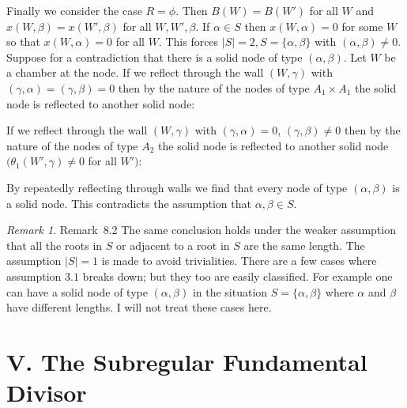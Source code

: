\documentclass{memo-l}
\theoremstyle{definition}
\theoremstyle{remark}
\newtheorem{remark}[theorem]{Remark}
\numberwithin{section}{chapter}
\numberwithin{equation}{chapter}
\begin{document}
   Finally we consider the case $R={\phi}$.  Then $B(W) = B(W')$ for all $W$
and $x(W,{\beta})=x(W',{\beta})$ for all $W,W',{\beta}$.  If ${\alpha}
 \in  S$ then $x(W,{\alpha})=0$ for some $W$ so that $x(W,{\alpha})=0$ for
all $W$.  This forces $\vert S\vert =2, S=\{{\alpha},{\beta}\}$ with
$({\alpha},{\beta})\ne 0$.  Suppose for a contradiction that there is a
solid node of type $({\alpha},{\beta})$.  Let $W$ be a chamber at the node.
If we reflect through the wall $(W,{\gamma})$ with
$({\gamma},{\alpha})=({\gamma},{\beta})=0$ then by the nature of the nodes
of type $A_{1}\times A_{1}$ the solid node is reflected to another solid node:

\medskip
\medskip

\noindent
If we reflect through the wall $(W,{\gamma})$ with $({\gamma},{\alpha}) = 0$,
$({\gamma},{\beta})\ne 0$ then by the nature of the nodes of type $A_{2}$
the solid node is reflected to another solid node
$({\theta}_{1}(W',{\gamma})\ne 0$ for all $W')$: 

\medskip
\medskip

\noindent
By repeatedly reflecting through walls we find that every node of type
$({\alpha},{\beta})$ is a solid node.  This contradicts the assumption that
${\alpha},{\beta}  \in  S$.

{\medskip}


\begin{remark}{Remark\ 8.2}  The same conclusion holds under the weaker
assumption that all the roots in $S$ or adjacent to a root in $S$ are the
same length.  The assumption $\vert S\vert = 1$ is made to avoid
trivialities.  There are a few cases where assumption $3.1$ breaks down;
but they too are easily classified.  For example one can have a solid node
of type $({\alpha},{\beta})$ in the situation $S = \{{\alpha},{\beta}\}$
where ${\alpha}$ and ${\beta}$ have different lengths.  I will not treat
these cases here.
\end{remark}




\chapter{V. The Subregular Fundamental Divisor}
\end{document}
